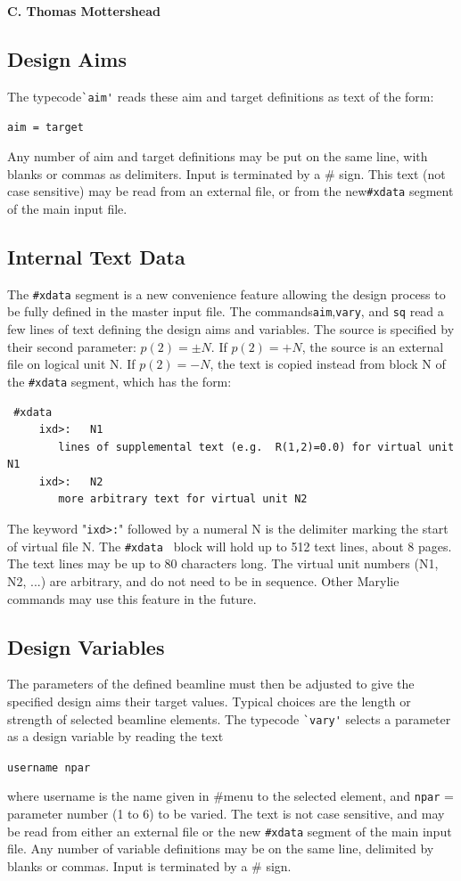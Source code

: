 \documentclass[11pt]{article} %
\newcommand{\sub}{\subsection}
\newcommand{\vb}{\verb ;}
\newcommand{\bvb}{\begin{verbatim}}
\begin{document}
\begin{center}  {\bf C. Thomas Mottershead }
\sub{Design Aims}
 The typecode\vb `aim'; reads these aim and target definitions as text of the form:

 \vb    aim = target;

 Any number of aim and target definitions may be put on the same line, with blanks or commas as delimiters. Input is terminated by a \# sign. This text (not case sensitive) may be read from an external file, or from the new\vb #xdata; segment of the main input file. 

% A few such beamline properties are selected as design "aims", to be driven to desired "target" values  by adjusting the same number of selected beamline variables.



\sub {Internal Text Data}
The \vb #xdata; segment is a new convenience feature allowing the design process to be fully defined in the master input file. The commands\vb aim;,\vb vary;, and \vb sq; read a few lines of text defining the design aims and variables. The source is specified by their second parameter: $ p(2) = \pm N $. If $ p(2)=+N $, the source is
an external file on logical unit N. If $p(2) = -N $, the text is copied instead from block N of the \vb #xdata; segment, which has the form:
\bvb
 #xdata
     ixd>:   N1
        lines of supplemental text (e.g.  R(1,2)=0.0) for virtual unit N1
     ixd>:   N2
        more arbitrary text for virtual unit N2
\end{verbatim}
 The keyword "\vb ixd>:;" followed by a numeral N is the delimiter marking the start of virtual file N. The \vb #xdata ; block will hold up to 512 text lines, about 8 pages. The text lines may be up to 80 characters long. The virtual unit numbers (N1, N2, ...) are arbitrary, and do not need to be in sequence. Other Marylie commands may use this feature in the future.

\sub {Design Variables}
 The parameters of the defined beamline must then be adjusted to give the specified design aims their target values. Typical choices are the length or strength of selected beamline elements. 
 The typecode \vb `vary'; selects a parameter as a design variable by reading the text

\vb         username npar;

where username is the name given in \#menu to the selected element, and \vb npar; = parameter number (1 to 6) to be varied. The text is not case sensitive, and may be read from either an external file or the new \vb #xdata; segment of the main input file. Any number of variable definitions may be on the same line, delimited by blanks or commas. Input is terminated by a \# sign.


\end{center}
\end{document}
